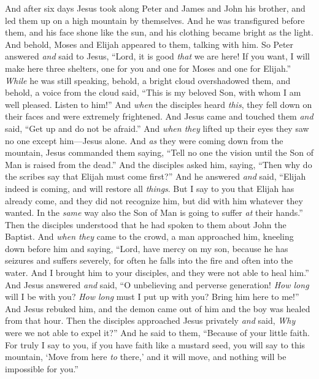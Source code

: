 \begin{biblechapter} %
 And after six days Jesus took along Peter and James and John his brother, and led them up on a high mountain by themselves.
\verse And he was transfigured before them, and his face shone like the sun, and his clothing became bright as the light.
\verse And behold, Moses and Elijah appeared to them, talking with him.
\verse So Peter answered \textit{and} said to Jesus, “Lord, it is good \textit{that} we are here! If you want, I will make here three shelters, one for you and one for Moses and one for Elijah.”
\verse \textit{While} he was still speaking, behold, a bright cloud overshadowed them, and behold, a voice from the cloud said, “This is my beloved Son, with whom I am well pleased. Listen to him!”
\verse And \textit{when} the disciples heard \textit{this}, they fell down on their faces and were extremely frightened.
\verse And Jesus came and touched them \textit{and} said, “Get up and do not be afraid.”
\verse And \textit{when they} lifted up their eyes they saw no one except him—Jesus alone.
\verse And \textit{as} they were coming down from the mountain, Jesus commanded them saying, “Tell no one the vision until the Son of Man is raised from the dead.”
\verse And the disciples asked him, saying, “Then why do the scribes say that Elijah must come first?”
\verse And he answered \textit{and} said, “Elijah indeed is coming, and will restore all \textit{things}.
\verse But I say to you that Elijah has already come, and they did not recognize him, but did with him whatever they wanted. In the \textit{same} way also the Son of Man is going to suffer \textit{at} their hands.”
\verse Then the disciples understood that he had spoken to them about John the Baptist.
 And \textit{when they} came to the crowd, a man approached him, kneeling down before him
\verse and saying, “Lord, have mercy on my son, because he has seizures and suffers severely, for often he falls into the fire and often into the water.
\verse And I brought him to your disciples, and they were not able to heal him.”
\verse And Jesus answered \textit{and} said, “O unbelieving and perverse generation! \textit{How long} will I be with you? \textit{How long} must I put up with you? Bring him here to me!”
\verse And Jesus rebuked him, and the demon came out of him and the boy was healed from that hour.
\verse Then the disciples approached Jesus privately \textit{and} said, \textit{Why} were we not able to expel it?”
\verse And he said to them, “Because of your little faith. For truly I say to you, if you have faith like a mustard seed, you will say to this mountain, ‘Move from here \textit{to} there,’ and it will move, and nothing will be impossible for you.”

\end{biblechapter}
